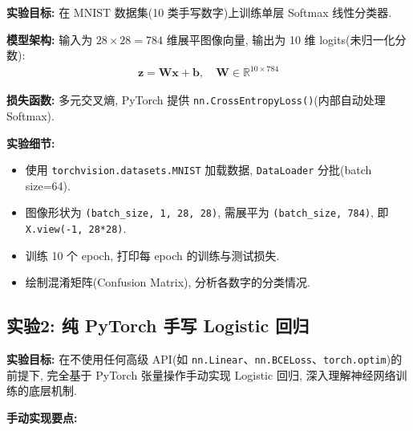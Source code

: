 \documentclass{../../nndlcourse}
\begin{document}
\textbf{实验目标: }在 MNIST 数据集(10 类手写数字)上训练单层 Softmax 线性分类器.

\textbf{模型架构: }输入为 $28\times28=784$ 维展平图像向量, 输出为 10 维 logits(未归一化分数): 
\begin{align}
    \boldsymbol{z} = \boldsymbol{W}\boldsymbol{x} + \boldsymbol{b}, \quad \boldsymbol{W}\in\mathbb{R}^{10\times 784}
\end{align}

\textbf{损失函数: }多元交叉熵, PyTorch 提供 \texttt{nn.CrossEntropyLoss()}(内部自动处理 Softmax).

\textbf{实验细节: }
\begin{itemize}
    \item 使用 \texttt{torchvision.datasets.MNIST} 加载数据, \texttt{DataLoader} 分批(batch size=64).
    \item 图像形状为 \texttt{(batch\_size, 1, 28, 28)}, 需展平为 \texttt{(batch\_size, 784)}, 即 \texttt{X.view(-1, 28*28)}.
    \item 训练 10 个 epoch, 打印每 epoch 的训练与测试损失.
    \item 绘制混淆矩阵(Confusion Matrix), 分析各数字的分类情况.
\end{itemize}

\subsection*{实验2: 纯 PyTorch 手写 Logistic 回归}

\textbf{实验目标: }在不使用任何高级 API(如 \texttt{nn.Linear}、\texttt{nn.BCELoss}、\texttt{torch.optim})的前提下, 
完全基于 PyTorch 张量操作手动实现 Logistic 回归, 深入理解神经网络训练的底层机制.

\textbf{手动实现要点: }
\end{document}
